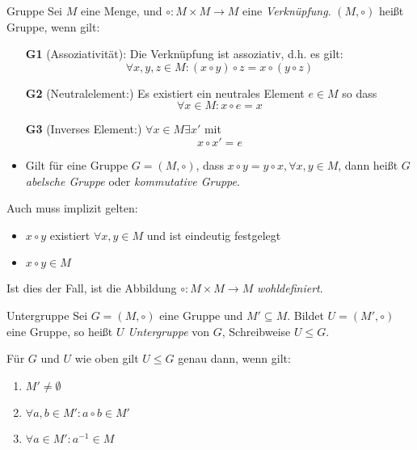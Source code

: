 \documentclass[german]{spicker}
\begin{document}
\begin{defi}{Gruppe}
    Sei $M$ eine Menge, und $\circ: M \times M \to M$ eine \emph{Verknüpfung}.
    $(M, \circ)$ heißt Gruppe, wenn gilt:
    \begin{itemize}
        \item[\textbf{G1}] (Assoziativität): Die Verknüpfung ist assoziativ, d.h. es gilt:
              $$
                  \forall x, y, z \in M : (x \circ y) \circ z = x \circ (y \circ z)
              $$
        \item[\textbf{G2}] (Neutralelement:) Es existiert ein neutrales Element $e \in M$ so dass
              $$
                  \forall x \in M : x \circ e = x
              $$
        \item[\textbf{G3}] (Inverses Element:) $\forall x \in M \exists x'$ mit
              $$
                  x \circ x' = e
              $$
        \item Gilt für eine Gruppe $G = (M, \circ)$, dass $x \circ y = y\circ x, \forall x, y \in M$, dann heißt $G$ \emph{abelsche Gruppe} oder \emph{kommutative Gruppe}.
    \end{itemize}

    Auch muss implizit gelten:
    \begin{itemize}
        \item $x \circ y$ existiert $\forall x, y \in M$ und ist eindeutig festgelegt
        \item $x \circ y \in M$
    \end{itemize}
    Ist dies der Fall, ist die Abbildung $\circ: M \times M \to M$ \emph{wohldefiniert}.
\end{defi}

\begin{defi}{Untergruppe}
    Sei $G = (M, \circ)$ eine Gruppe und $M' \subseteq M$. Bildet $U = (M', \circ)$ eine Gruppe, so heißt $U$ \emph{Untergruppe} von $G$, Schreibweise $U \leq G$.

    Für $G$ und $U$ wie oben gilt $U \leq G$ genau dann, wenn gilt:
    \begin{enumerate}
        \item $M'\neq \emptyset$
        \item $\forall a, b \in M' : a\circ b \in M'$
        \item $\forall a \in M': a^{-1} \in M$
    \end{enumerate}
\end{defi}

\newpage
\end{document}
